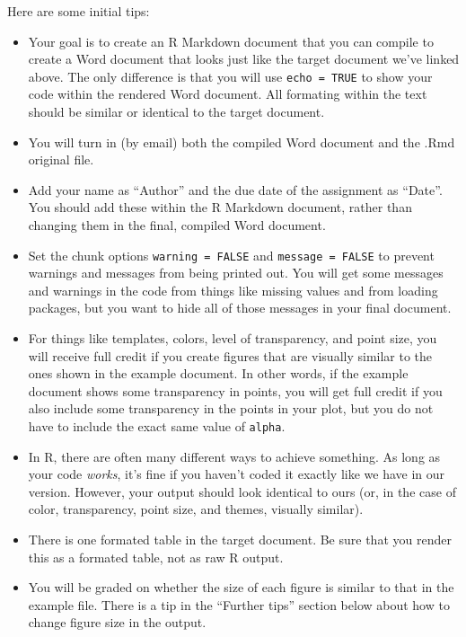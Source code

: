 \documentclass[]{book}
\providecommand{\tightlist}{%
  \setlength{\itemsep}{0pt}\setlength{\parskip}{0pt}}
\theoremstyle{definition}
\theoremstyle{definition}
\theoremstyle{definition}
\theoremstyle{remark}
\begin{document}
Here are some initial tips:

\begin{itemize}
\tightlist
\item
  Your goal is to create an R Markdown document that you can compile to
  create a Word document that looks just like the target document we've
  linked above. The only difference is that you will use
  \texttt{echo\ =\ TRUE} to show your code within the rendered Word
  document. All formating within the text should be similar or identical
  to the target document.\\
\item
  You will turn in (by email) both the compiled Word document and the
  .Rmd original file.
\item
  Add your name as ``Author'' and the due date of the assignment as
  ``Date''. You should add these within the R Markdown document, rather
  than changing them in the final, compiled Word document.
\item
  Set the chunk options \texttt{warning\ =\ FALSE} and
  \texttt{message\ =\ FALSE} to prevent warnings and messages from being
  printed out. You will get some messages and warnings in the code from
  things like missing values and from loading packages, but you want to
  hide all of those messages in your final document.
\item
  For things like templates, colors, level of transparency, and point
  size, you will receive full credit if you create figures that are
  visually similar to the ones shown in the example document. In other
  words, if the example document shows some transparency in points, you
  will get full credit if you also include some transparency in the
  points in your plot, but you do not have to include the exact same
  value of \texttt{alpha}.
\item
  In R, there are often many different ways to achieve something. As
  long as your code \emph{works}, it's fine if you haven't coded it
  exactly like we have in our version. However, your output should look
  identical to ours (or, in the case of color, transparency, point size,
  and themes, visually similar).
\item
  There is one formated table in the target document. Be sure that you
  render this as a formated table, not as raw R output.
\item
  You will be graded on whether the size of each figure is similar to
  that in the example file. There is a tip in the ``Further tips''
  section below about how to change figure size in the output.
\end{itemize}
\end{document}
